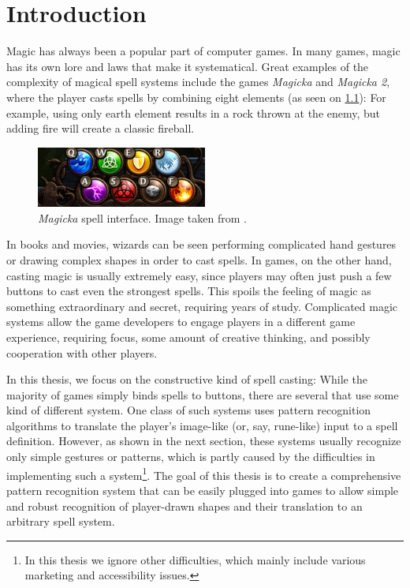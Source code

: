 \chapter{Introduction}
Magic has always been a popular part of computer games. In many games, magic has its own lore and laws that make it systematical. Great examples of the complexity of magical spell systems include the games \emph{Magicka} and \emph{Magicka 2}, where the player casts spells by combining eight elements (as seen on \cref{fig:magicka}): For example, using only earth element results in a rock thrown at the enemy, but adding fire will create a classic fireball.

\begin{figure}
  \centering
  \includegraphics[width=0.5\textwidth]{ext/magicka.png}
  \caption{\emph{Magicka} spell interface. Image taken from \citet{magicka}. }
  \label{fig:magicka}
\end{figure}

In books and movies, wizards can be seen performing complicated hand gestures or drawing complex shapes in order to cast spells. In games, on the other hand, casting magic is usually extremely easy, since players may often just push a few buttons to cast even the strongest spells. This spoils the feeling of magic as something extraordinary and secret, requiring years of study. Complicated magic systems allow the game developers to engage players in a different game experience, requiring focus, some amount of creative thinking, and possibly cooperation with other players.

In this thesis, we focus on the constructive kind of spell casting: While the majority of games simply binds spells to buttons, there are several that use some kind of different system. One class of such systems uses pattern recognition algorithms to translate the player's image-like (or, say, rune-like) input to a spell definition. However, as shown in the next section, these systems usually recognize only simple gestures or patterns, which is partly caused by the difficulties in implementing such a system\footnote{In this thesis we ignore other difficulties, which mainly include various marketing and accessibility issues.}. The goal of this thesis is to create a comprehensive pattern recognition system that can be easily plugged into games to allow simple and robust recognition of player-drawn shapes and their translation to an arbitrary spell system.

